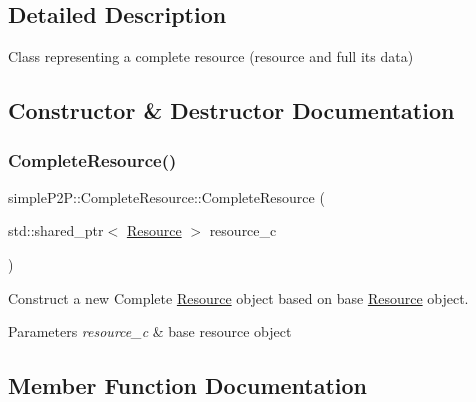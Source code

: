 \subsection{Detailed Description}
Class representing a complete resource (resource and full its data) 



\subsection{Constructor \& Destructor Documentation}
\mbox{\label{classsimpleP2P_1_1CompleteResource_a758df5fa183938450b71d1e36af8fbaf}} 
\subsubsection{\texorpdfstring{Complete\+Resource()}{CompleteResource()}}
{\footnotesize\ttfamily simple\+P2\+P\+::\+Complete\+Resource\+::\+Complete\+Resource (\begin{DoxyParamCaption}\item[{std\+::shared\+\_\+ptr$<$ \hyperlink{classsimpleP2P_1_1Resource}{Resource} $>$}]{resource\+\_\+c }\end{DoxyParamCaption})}



Construct a new Complete \hyperlink{classsimpleP2P_1_1Resource}{Resource} object based on base \hyperlink{classsimpleP2P_1_1Resource}{Resource} object. 


\begin{DoxyParams}{Parameters}
{\em resource\+\_\+c} & base resource object \\
\hline
\end{DoxyParams}


\subsection{Member Function Documentation}
\mbox{\label{classsimpleP2P_1_1CompleteResource_ac31825cc3bed61d181456430db3878f4}} 
